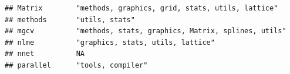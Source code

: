 \documentclass[]{article}
\begin{document}
\begin{verbatim}
## Matrix        "methods, graphics, grid, stats, utils, lattice"                                                                                                                                                                                                                                                                                                                                                                                                                                      
## methods       "utils, stats"                                                                                                                                                                                                                                                                                                                                                                                                                                                                        
## mgcv          "methods, stats, graphics, Matrix, splines, utils"                                                                                                                                                                                                                                                                                                                                                                                                                                    
## nlme          "graphics, stats, utils, lattice"                                                                                                                                                                                                                                                                                                                                                                                                                                                     
## nnet          NA                                                                                                                                                                                                                                                                                                                                                                                                                                                                                    
## parallel      "tools, compiler"                                                                                                                                                                                                                                                                                                                                                                                                                                                                     

\end{verbatim}
\end{document}
